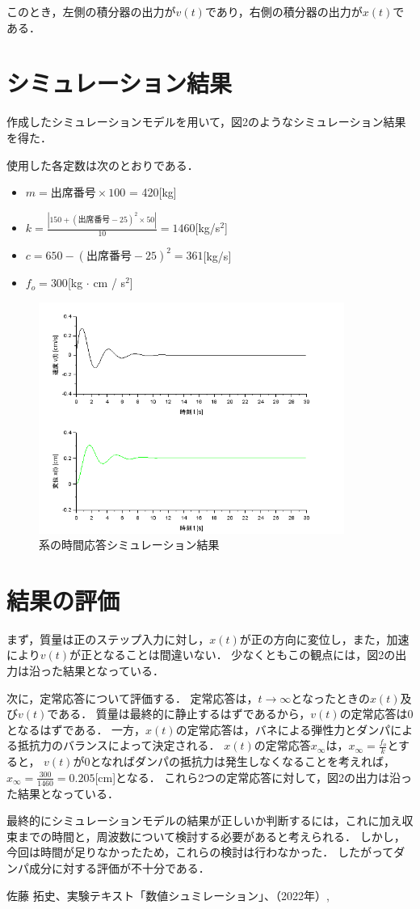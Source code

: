 \documentclass[dvipdfmx,titlepage,a4j]{jsarticle}  %
\begin{document}
このとき，左側の積分器の出力が$v(t)$であり，右側の積分器の出力が$x(t)$である．

\section{シミュレーション結果}
作成したシミュレーションモデルを用いて，図2のようなシミュレーション結果を得た．

使用した各定数は次のとおりである．
\begin{itemize}
  \item $m = 出席番号 \times 100$ = 420[kg]
  \item $k = \frac{|150 + (出席番号 - 25)^2 \times 50|}{10} = 1460$[kg/s$^2$]
  \item $c = 650 - (出席番号 - 25)^2 = 361$[kg/s]
  \item $f_o = 300$[kg $\cdot$ cm / s$^2$]
\end{itemize}

\begin{figure}[H]
  \centering
  \includegraphics[width=10cm]{../graph/bane-graph.png}
  \caption{系の時間応答シミュレーション結果}
  \label{fig:bane-graph.png}
\end{figure}

\section{結果の評価}
まず，質量は正のステップ入力に対し，$x(t)$が正の方向に変位し，また，加速により$v(t)$が正となることは間違いない．
少なくともこの観点には，図2の出力は沿った結果となっている．

次に，定常応答について評価する．
定常応答は，$t \rightarrow \infty$となったときの$x(t)$及び$v(t)$である．
質量は最終的に静止するはずであるから，$v(t)$の定常応答は0となるはずである．
一方，$x(t)$の定常応答は，バネによる弾性力とダンパによる抵抗力のバランスによって決定される．
$x(t)$の定常応答$x_\infty$は，$x_\infty = \frac{f_o}{k}$とすると，
$v(t)$が0となればダンパの抵抗力は発生しなくなることを考えれば，$x_\infty = \frac{300}{1460} = 0.205$[cm]となる．
これら2つの定常応答に対して，図2の出力は沿った結果となっている．

最終的にシミュレーションモデルの結果が正しいか判断するには，これに加え収束までの時間と，周波数について検討する必要があると考えられる．
しかし，今回は時間が足りなかったため，これらの検討は行わなかった．
したがってダンパ成分に対する評価が不十分である．

\begin{thebibliography}{99}
   佐藤 拓史、実験テキスト「数値シュミレーション」、（2022年）,
\end{thebibliography}
\end{document}
